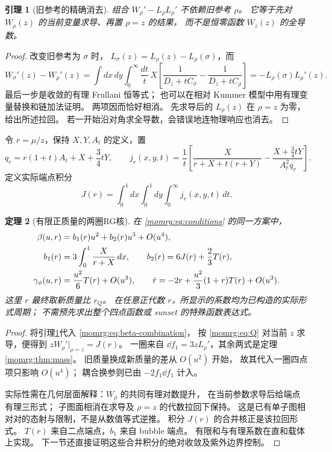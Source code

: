 \documentclass[11pt,a4paper,oneside]{ctexart}
\theoremstyle{cnplain}
\newtheorem{theorem}{定理}[section]
\newtheorem{lemma}[theorem]{引理}
\theoremstyle{definition}
\theoremstyle{remark}
\numberwithin{equation}{section}
\begin{document}
\begin{lemma}[旧参考的精确消去]\label{momrg:lem:reference}
组合 $W_\rho'-L_\rho L_\rho'$ 不依赖旧参考 $\rho$。
它等于先对 $W_\rho(z)$ 的当前变量求导、再置 $\rho=z$ 的结果，
而不是恒零函数 $W_z(z)$ 的全导数。
\end{lemma}
\begin{proof}
改变旧参考为 $\sigma$ 时，
$L_\sigma(z)=L_\rho(z)-L_\rho(\sigma)$，而
\[
 W_\sigma'(z)-W_\rho'(z)
 =\int dx\,dy\int_0^\infty\frac{dt}{t}\,
 X\left[\frac1{D_z+tC_\sigma}-\frac1{D_z+tC_\rho}\right]
 =-L_\rho(\sigma)L_\rho'(z).
\]
最后一步是收敛的有理 Frullani 恒等式；
也可以在相对 Kummer 模型中用有理变量替换和链加法证明。
两项因而恰好相消。
先求导后的 $L_\rho(z)$ 在 $\rho=z$ 为零，给出所述拉回。
若一开始沿对角求全导数，会错误地连物理响应也消去。
\end{proof}

令 $r=\mu/z$，保持 $X,Y,A_t$ 的定义，置
\[
 q_r=r(1+t)A_t+X+\frac34tY,\qquad
 j_r(x,y,t)=\frac1t
 \left[
  \frac{X}{r+X+t(r+Y)}
       -\frac{X+\frac34tY}{A_t^2q_r}
 \right].
\]
定义实际端点积分
\begin{equation}\label{momrg:eq:J}
 J(r)=\int_0^1dx\int_0^1dy\int_0^\infty j_r(x,y,t)\,dt.
\end{equation}

\begin{theorem}[有限正质量的两圈RG核]\label{momrg:thm:beta}
在 \eqref{momrg:eq:conditions} 的同一方案中，
\begin{align}
 \beta(u,r)&=b_1(r)u^2+b_2(r)u^3+O(u^4),\label{momrg:eq:beta}\\
 b_1(r)&=3\int_0^1\frac{X}{r+X}\,dx,\qquad
 b_2(r)=6J(r)+\frac23T(r),\label{momrg:eq:b12}\\
 \gamma_\phi(u,r)&=\frac{u^2}{6}T(r)+O(u^3),\qquad
 \dot r=-2r+\frac{u^2}{3}(1+r)T(r)+O(u^3).
                                                        \label{momrg:eq:vector}
\end{align}
这里 $r$ 最终取新质量比 $r_Q$。
在任意正代数 $r$，所显示的系数均为已构造的实际形式周期；
不需预先求出整个四点函数或 sunset 的特殊函数表达式。
\end{theorem}
\begin{proof}
将引理\ref{momrg:lem:reference}代入 \eqref{momrg:eq:beta-combination}，
按 \eqref{momrg:eq:Q} 对当前 $z$ 求导，便得到
$zW_\rho'|_{\rho=z}=J(r)$。
一圈来自 $\dd f_1=3zL_\rho'$，其余两式是定理\ref{momrg:thm:mass}。
旧质量换成新质量的差从 $O(u^2)$ 开始，
故其代入一圈四点项只影响 $O(u^4)$；
耦合换参则已由 $-2f_1\dd f_1$ 计入。

实际性需在几何层面解释：$W_\rho$ 的共同有理对数提升，
在当前参数求导后给端点有理三形式；
子图面相消在求导及 $\rho=z$ 的代数拉回下保持。
这是已有单子图相对对的态射与限制，不是从数值等式逆推。
积分 $J(r)$ 的合并核正是该拉回形式。
$T(r)$ 来自二点端点，$b_1$ 来自 bubble 端点。
有限和与有理系数在直和载体上实现。
下一节还直接证明这些合并积分的绝对收敛及紫外边界控制。
\end{proof}
\end{document}
